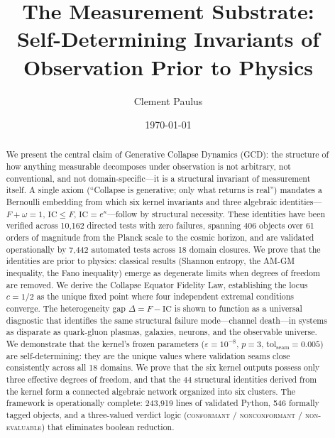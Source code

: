 \documentclass[
  aps,
  prd,
  twocolumn,
  superscriptaddress,
  nofootinbib,
  floatfix
]{revtex4-2}
\newcommand{\eps}{\varepsilon}
\newcommand{\tolseam}{\mathrm{tol}_{\mathrm{seam}}}
\newcommand{\regime}[1]{\textsc{#1}}
\newcommand{\conform}{\regime{conformant}}
\newcommand{\nonconform}{\regime{nonconformant}}
\newcommand{\IC}{\mathrm{IC}}
\begin{document}
\title{The Measurement Substrate:
\texorpdfstring{\\}{: }Self-Determining Invariants
of Observation Prior to Physics}

\author{Clement Paulus}

\date{\today}

\begin{abstract}
We present the central claim of Generative Collapse Dynamics (GCD):
the structure of how anything measurable decomposes under observation
is not arbitrary, not conventional, and not domain-specific---it is a
structural invariant of measurement itself.  A single axiom
(``Collapse is generative; only what returns is real'') mandates a
Bernoulli embedding from which six kernel invariants and three
algebraic identities---$F + \omega = 1$, $\IC \leq F$,
$\IC = e^\kappa$---follow by structural necessity.  These identities
have been verified across 10{,}162 directed tests with zero failures,
spanning 406 objects over 61 orders of magnitude from the Planck
scale to the cosmic horizon, and are validated operationally by
7{,}442 automated tests across 18 domain closures.
We prove that the identities are prior to physics: classical results
(Shannon entropy, the AM-GM inequality, the Fano inequality) emerge
as degenerate limits when degrees of freedom are removed.
We derive the Collapse Equator Fidelity Law, establishing the locus
$c = 1/2$ as the unique fixed point where four independent
extremal conditions converge.
The heterogeneity gap $\Delta = F - \IC$ is shown to function as a
universal diagnostic that identifies the same structural failure
mode---channel death---in systems as disparate as quark-gluon
plasmas, galaxies, neurons, and the observable universe.
We demonstrate that the kernel's frozen parameters
($\eps = 10^{-8}$, $p = 3$, $\tolseam = 0.005$) are
self-determining: they are the unique values where validation seams
close consistently across all 18 domains.
We prove that the six kernel outputs possess only three effective
degrees of freedom, and that the 44 structural identities derived
from the kernel form a connected algebraic network organized into
six clusters.
The framework is operationally complete: 243{,}919 lines of
validated Python, 546 formally tagged objects, and a three-valued
verdict logic (\conform{} / \nonconform{} / \regime{non-evaluable})
that eliminates boolean reduction.
\end{abstract}
\end{document}
